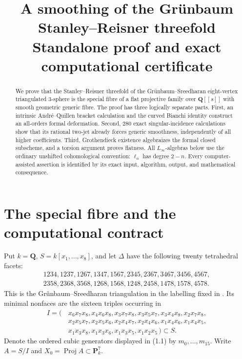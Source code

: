 \documentclass[11pt]{article}
\title{A smoothing of the Gr\"unbaum Stanley--Reisner threefold\\
\large Standalone proof and exact computational certificate}
\author{}
\date{}
\theoremstyle{definition}
\theoremstyle{remark}
\newcommand{\QQ}{\mathbf Q}
\newcommand{\PP}{\mathbf P}
\newcommand{\Proj}{\operatorname{Proj}}
\begin{document}
\maketitle

\begin{abstract}
We prove that the Stanley--Reisner threefold of the Gr\"unbaum--Sreedharan
eight-vertex triangulated $3$-sphere is the special fibre of a flat projective
family over $\QQ[[s]]$ with smooth geometric generic fibre.  The proof has
three logically separate parts.  First, an intrinsic Andr\'e--Quillen bracket
calculation and the curved Bianchi identity construct an all-orders formal
deformation.  Second, 280 exact singular-incidence calculations show that its
rational two-jet already forces generic smoothness, independently of all
higher coefficients.  Third, Grothendieck existence algebraizes the formal
closed subscheme, and a torsion argument proves flatness.  All
$L_\infty$-algebras below use the ordinary unshifted cohomological convention:
$\ell_n$ has degree $2-n$.  Every computer-assisted assertion is identified
by its exact input, algorithm, output, and mathematical consequence.
\end{abstract}

\tableofcontents

\section{The special fibre and the computational contract}

Put $k=\QQ$, $S=k[x_1,\ldots,x_8]$, and let $\Delta$ have the following
twenty tetrahedral facets:
\[
\begin{gathered}
1234,1237,1267,1347,1567,2345,2367,3467,3456,4567,\\
2358,2368,3568,1268,1568,1248,2458,1478,1578,4578.
\end{gathered}
\]
This is the Gr\"unbaum--Sreedharan triangulation in the labelling fixed in
\cite{GS}.  Its minimal nonfaces are the sixteen triples occurring in
\[
\begin{split}
I=(\,&x_6x_7x_8,x_4x_6x_8,x_3x_7x_8,x_3x_5x_7,
x_3x_4x_8,x_2x_7x_8,\\
&x_2x_5x_7,x_2x_5x_6,x_2x_4x_7,x_2x_4x_6,
x_1x_4x_6,x_1x_4x_5,\\
&x_1x_3x_8,x_1x_3x_6,x_1x_3x_5,x_1x_2x_5\,)\subset S.
\end{split}                                                    \tag{1.1}
\]
Denote the ordered cubic generators displayed in (1.1) by
$m_0,\ldots,m_{15}$.  Write $A=S/I$ and $X_0=\Proj A\subset\PP^7_k$.
\end{document}
